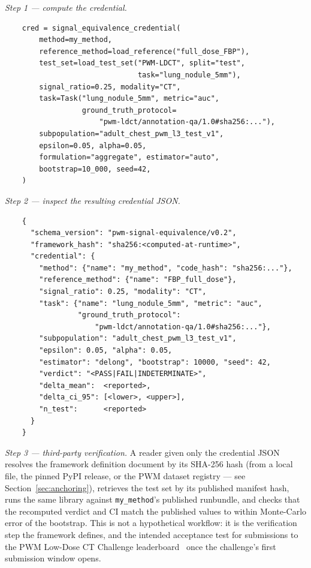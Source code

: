 \documentclass[twoside,11pt]{article}
\begin{document}
\textit{Step 1 --- compute the credential.}
\begin{verbatim}
    cred = signal_equivalence_credential(
        method=my_method,
        reference_method=load_reference("full_dose_FBP"),
        test_set=load_test_set("PWM-LDCT", split="test",
                               task="lung_nodule_5mm"),
        signal_ratio=0.25, modality="CT",
        task=Task("lung_nodule_5mm", metric="auc",
                  ground_truth_protocol=
                      "pwm-ldct/annotation-qa/1.0#sha256:..."),
        subpopulation="adult_chest_pwm_l3_test_v1",
        epsilon=0.05, alpha=0.05,
        formulation="aggregate", estimator="auto",
        bootstrap=10_000, seed=42,
    )
\end{verbatim}

\textit{Step 2 --- inspect the resulting credential JSON.}
\begin{verbatim}
    {
      "schema_version": "pwm-signal-equivalence/v0.2",
      "framework_hash": "sha256:<computed-at-runtime>",
      "credential": {
        "method": {"name": "my_method", "code_hash": "sha256:..."},
        "reference_method": {"name": "FBP_full_dose"},
        "signal_ratio": 0.25, "modality": "CT",
        "task": {"name": "lung_nodule_5mm", "metric": "auc",
                 "ground_truth_protocol":
                     "pwm-ldct/annotation-qa/1.0#sha256:..."},
        "subpopulation": "adult_chest_pwm_l3_test_v1",
        "epsilon": 0.05, "alpha": 0.05,
        "estimator": "delong", "bootstrap": 10000, "seed": 42,
        "verdict": "<PASS|FAIL|INDETERMINATE>",
        "delta_mean":  <reported>,
        "delta_ci_95": [<lower>, <upper>],
        "n_test":      <reported>
      }
    }
\end{verbatim}

\textit{Step 3 --- third-party verification.} A reader given only the credential JSON resolves the framework definition document by its SHA-256 hash (from a local file, the pinned PyPI release, or the PWM dataset registry --- see Section~\ref{sec:anchoring}), retrieves the test set by its published manifest hash, runs the same library against \texttt{my\_method}'s published runbundle, and checks that the recomputed verdict and CI match the published values to within Monte-Carlo error of the bootstrap. This is not a hypothetical workflow: it is the verification step the framework defines, and the intended acceptance test for submissions to the PWM Low-Dose CT Challenge leaderboard~\citep{ws4leaderboard} once the challenge's first submission window opens.
\end{document}
